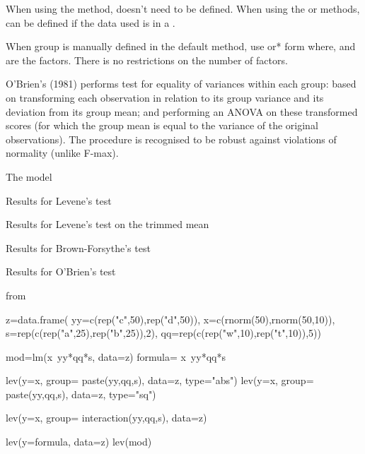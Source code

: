 \documentclass[a4paper]{book}
\begin{document}
\begin{Details}\relax
When using the  method,  doesn't need to be defined. When using the
 or  methods,  can be defined if the data used
is in a .

When group is manually defined in the default method, use  or\bsl{}*
form where,  and 
are the factors. There is no restrictions on the number of factors.

O'Brien's (1981) performs test for equality of variances within each group:
based on transforming each observation in relation to its group variance
and its deviation from its group mean; and performing an ANOVA on these
transformed scores (for which the group mean is equal to the variance of the
original observations). The procedure is recognised to be robust against
violations of normality (unlike F-max).


\end{Details}
%
\begin{Value}

\begin{ldescription}
\item[\code{Model}] The model
\item[\code{Levene}] Results for Levene's test
\item[\code{LeveneTrimMean}] Results for Levene's test on the trimmed mean
\item[\code{Brown.Forsythe}] Results for Brown-Forsythe's test
\item[\code{OBrien}] Results for O'Brien's test

\end{ldescription}
\end{Value}
%
\begin{SeeAlso}\relax
{} from 
\end{SeeAlso}
%
\begin{Examples}
\begin{ExampleCode}
z=data.frame( yy=c(rep("c",50),rep("d",50)),
              x=c(rnorm(50),rnorm(50,10)),
              s=rep(c(rep("a",25),rep("b",25)),2),
              qq=rep(c(rep("w",10),rep("t",10)),5))

mod=lm(x~yy*qq*s, data=z)
formula= x~yy*qq*s

lev(y=x, group= paste(yy,qq,s), data=z, type="abs")
lev(y=x, group= paste(yy,qq,s), data=z, type="sq")

lev(y=x, group= interaction(yy,qq,s), data=z)

lev(y=formula, data=z)
lev(mod)

\end{ExampleCode}
\end{Examples}
\end{document}
